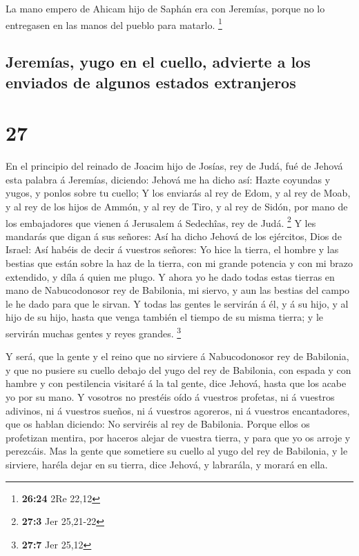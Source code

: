  La mano empero de Ahicam hijo de Saphán era con Jeremías,
porque no lo entregasen en las manos del pueblo para matarlo.
\footnote{\textbf{26:24} 2Re 22,12}

\hypertarget{jeremuxedas-yugo-en-el-cuello-advierte-a-los-enviados-de-algunos-estados-extranjeros}{%
\subsection{Jeremías, yugo en el cuello, advierte a los enviados de
algunos estados
extranjeros}\label{jeremuxedas-yugo-en-el-cuello-advierte-a-los-enviados-de-algunos-estados-extranjeros}}

\hypertarget{section-26}{%
\section{27}\label{section-26}}

 En el principio del reinado de Joacim hijo de Josías, rey
de Judá, fué de Jehová esta palabra á Jeremías, diciendo: 
Jehová me ha dicho así: Hazte coyundas y yugos, y ponlos sobre tu
cuello;  Y los enviarás al rey de Edom, y al rey de Moab, y
al rey de los hijos de Ammón, y al rey de Tiro, y al rey de Sidón, por
mano de los embajadores que vienen á Jerusalem á Sedechîas, rey de Judá.
\footnote{\textbf{27:3} Jer 25,21-22}  Y les mandarás que
digan á sus señores: Así ha dicho Jehová de los ejércitos, Dios de
Israel: Así habéis de decir á vuestros señores:  Yo hice la
tierra, el hombre y las bestias que están sobre la haz de la tierra, con
mi grande potencia y con mi brazo extendido, y díla á quien me plugo.
 Y ahora yo he dado todas estas tierras en mano de
Nabucodonosor rey de Babilonia, mi siervo, y aun las bestias del campo
le he dado para que le sirvan.  Y todas las gentes le
servirán á él, y á su hijo, y al hijo de su hijo, hasta que venga
también el tiempo de su misma tierra; y le servirán muchas gentes y
reyes grandes. \footnote{\textbf{27:7} Jer 25,12}

 Y será, que la gente y el reino que no sirviere á
Nabucodonosor rey de Babilonia, y que no pusiere su cuello debajo del
yugo del rey de Babilonia, con espada y con hambre y con pestilencia
visitaré á la tal gente, dice Jehová, hasta que los acabe yo por su
mano.  Y vosotros no prestéis oído á vuestros profetas, ni á
vuestros adivinos, ni á vuestros sueños, ni á vuestros agoreros, ni á
vuestros encantadores, que os hablan diciendo: No serviréis al rey de
Babilonia.  Porque ellos os profetizan mentira, por haceros
alejar de vuestra tierra, y para que yo os arroje y perezcáis.
 Mas la gente que sometiere su cuello al yugo del rey de
Babilonia, y le sirviere, haréla dejar en su tierra, dice Jehová, y
labrarála, y morará en ella.

